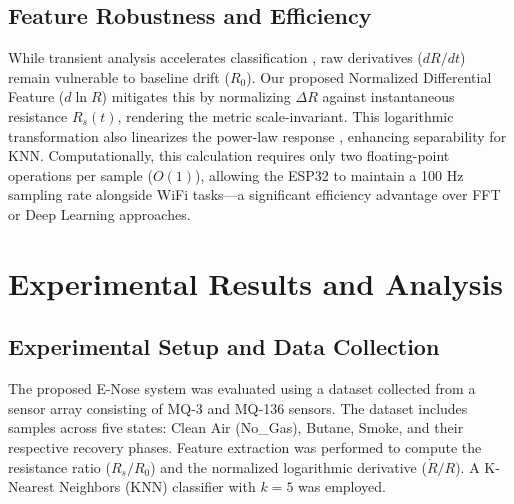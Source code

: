 \documentclass[conference]{IEEEtran}
\begin{document}
\subsection{Feature Robustness and Efficiency}
While transient analysis accelerates classification \cite{siadat2014detection}, raw derivatives ($dR/dt$) remain vulnerable to baseline drift ($R_0$). Our proposed Normalized Differential Feature ($d \ln R$) mitigates this by normalizing $\Delta R$ against instantaneous resistance $R_s(t)$, rendering the metric scale-invariant. This logarithmic transformation also linearizes the power-law response \cite{gardner1991detection}, enhancing separability for KNN. Computationally, this calculation requires only two floating-point operations per sample ($O(1)$), allowing the ESP32 to maintain a 100 Hz sampling rate alongside WiFi tasks—a significant efficiency advantage over FFT or Deep Learning approaches.

\section{Experimental Results and Analysis}

\subsection{Experimental Setup and Data Collection}
The proposed E-Nose system was evaluated using a dataset collected from a sensor array consisting of MQ-3 and MQ-136 sensors. The dataset includes samples across five states: Clean Air (No\_Gas), Butane, Smoke, and their respective recovery phases. Feature extraction was performed to compute the resistance ratio ($R_s/R_0$) and the normalized logarithmic derivative ($\dot{R}/R$). A K-Nearest Neighbors (KNN) classifier \cite{cover1967nearest} with $k=5$ was employed.
\end{document}
